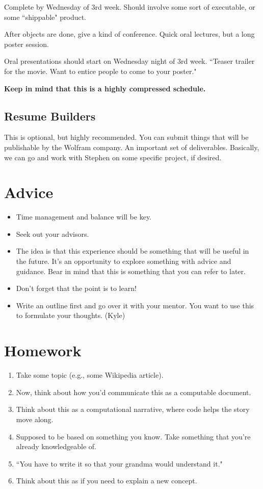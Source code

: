 \documentclass[11pt]{article}
\theoremstyle{definition}
\begin{document}
Complete by Wednesday of 3rd week. Should involve some sort of executable, or some ``shippable" product. 

After objects are done, give a kind of conference. Quick oral lectures, but a long poster session. 

Oral presentations should start on Wednesday night of 3rd week. ``Teaser trailer for the movie. Want to entice people to come to your poster."

\textbf{Keep in mind that this is a highly compressed schedule. }

\subsection{Resume Builders}

This is optional, but highly recommended. You can submit things that will be publishable by the Wolfram company. An important set of deliverables. Basically, we can go and work with Stephen on some specific project, if desired. 

\section{Advice}

\begin{itemize}
\item Time management and balance will be key. 
\item Seek out your advisors. 
\item The idea is that this experience should be something that will be useful in the future. It's an opportunity to explore something with advice and guidance. Bear in mind that this is something that you can refer to later. 
\item Don't forget that the point is to learn!
\item Write an outline first and go over it with your mentor. You want to use this to formulate your thoughts. (Kyle)
\end{itemize}

\section{Homework}

\begin{enumerate}
\item Take some topic (e.g., some Wikipedia article).
\item Now, think about how you'd communicate this as a computable document. 
\item Think about this as a computational narrative, where code helps the story move along. 
\item Supposed to be based on something you know. Take something that you're already knowledgeable of. 
\item ``You have to write it so that your grandma would understand it."
\item Think about this as if you need to explain a new concept.
\end{enumerate}
\end{document}
